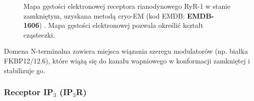 \begin{figure}[tb]
 \begin{center}
 \end{center}
 \caption[Mapa gęstości elektronowej receptora RyR1]{Mapa gęstości elektronowej receptora rianodynowego RyR-1 w stanie zamkniętym, uzyskana metodą cryo-EM (kod EMDB: \textbf{EMDB-1606}) \cite{Samso2009}. Mapa gęstości elektronowej pozwala określić kształt cząsteczki.}
 \label{fig:RyRcryo}
\end{figure}

Domena N-terminalna zawiera miejsca wiązania szeregu modulatorów (np. białka FKBP12/12.6), które wiążą się do kanału wapniowego w konformacji zamkniętej i stabilizuje go.


\FloatBarrier
\subsubsection{Receptor IP$_3$ (IP$_3$R)}


